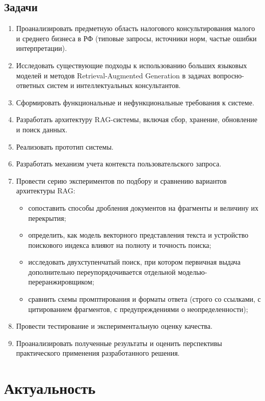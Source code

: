 \documentclass[a4paper,12pt]{article}
\begin{document}
\subsection{Задачи}
\begin{enumerate}
  \item Проанализировать предметную область налогового консультирования малого и среднего бизнеса в РФ (типовые запросы, источники норм, частые ошибки интерпретации).
  \item Исследовать существующие подходы к использованию больших языковых моделей и методов Retrieval-Augmented Generation в задачах вопросно-ответных систем и интеллектуальных консультантов.
  \item Сформировать функциональные и нефункциональные требования к системе.
  \item Разработать архитектуру RAG-системы, включая сбор, хранение, обновление и поиск данных.
  \item Реализовать прототип системы.
  \item Разработать механизм учета контекста пользовательского запроса.
  \item Провести серию экспериментов по подбору и сравнению вариантов архитектуры RAG:
    \begin{itemize}
      \item сопоставить способы дробления документов на фрагменты и величину их перекрытия;
      \item определить, как модель векторного представления текста и устройство поискового индекса влияют на полноту и точность поиска;
      \item исследовать двухступенчатый поиск, при котором первичная выдача дополнительно переупорядочивается отдельной моделью-переранжировщиком;
      \item сравнить схемы промптирования и форматы ответа (строго со ссылками, с цитированием фрагментов, с предупреждениями о неопределенности);
    \end{itemize}
  \item Провести тестирование и экспериментальную оценку качества.
  \item Проанализировать полученные результаты и оценить перспективы практического применения разработанного решения.
\end{enumerate}

\newpage
\section{Актуальность}
\end{document}
